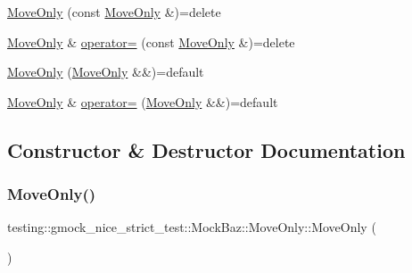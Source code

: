 \begin{DoxyCompactItemize}
\mbox{\hyperlink{classtesting_1_1gmock__nice__strict__test_1_1_mock_baz_1_1_move_only_a1d65fbd2e662ac36766eddd1afc27dc5}{Move\+Only}} (const \mbox{\hyperlink{classtesting_1_1gmock__nice__strict__test_1_1_mock_baz_1_1_move_only}{Move\+Only}} \&)=delete
\item 
\mbox{\hyperlink{classtesting_1_1gmock__nice__strict__test_1_1_mock_baz_1_1_move_only}{Move\+Only}} \& \mbox{\hyperlink{classtesting_1_1gmock__nice__strict__test_1_1_mock_baz_1_1_move_only_ab2fb7928f447be64460417dd63e55b1d}{operator=}} (const \mbox{\hyperlink{classtesting_1_1gmock__nice__strict__test_1_1_mock_baz_1_1_move_only}{Move\+Only}} \&)=delete
\item 
\mbox{\hyperlink{classtesting_1_1gmock__nice__strict__test_1_1_mock_baz_1_1_move_only_add8e748eb951f33836f483c258e0236a}{Move\+Only}} (\mbox{\hyperlink{classtesting_1_1gmock__nice__strict__test_1_1_mock_baz_1_1_move_only}{Move\+Only}} \&\&)=default
\item 
\mbox{\hyperlink{classtesting_1_1gmock__nice__strict__test_1_1_mock_baz_1_1_move_only}{Move\+Only}} \& \mbox{\hyperlink{classtesting_1_1gmock__nice__strict__test_1_1_mock_baz_1_1_move_only_a8087ccdb93d18a866b948620f6bb9cff}{operator=}} (\mbox{\hyperlink{classtesting_1_1gmock__nice__strict__test_1_1_mock_baz_1_1_move_only}{Move\+Only}} \&\&)=default
\end{DoxyCompactItemize}


\subsection{Constructor \& Destructor Documentation}
\mbox{\label{classtesting_1_1gmock__nice__strict__test_1_1_mock_baz_1_1_move_only_afb1f7d62babd32bbc8219bdc666fea83}} 
\subsubsection{\texorpdfstring{MoveOnly()}{MoveOnly()}\hspace{0.1cm}{\footnotesize\ttfamily [1/6]}}
{\footnotesize\ttfamily testing\+::gmock\+\_\+nice\+\_\+strict\+\_\+test\+::\+Mock\+Baz\+::\+Move\+Only\+::\+Move\+Only (\begin{DoxyParamCaption}{ }\end{DoxyParamCaption})\hspace{0.3cm}{\ttfamily [default]}}

